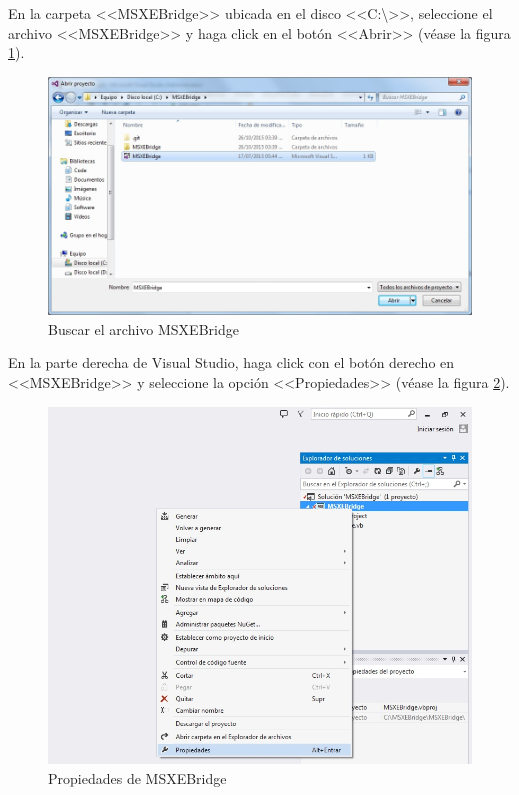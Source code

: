 En la carpeta <<MSXEBridge>> ubicada en el disco <<C:\textbackslash>>, seleccione el archivo <<MSXEBridge>> y haga click en el bot\'{o}n <<Abrir>> (v\'{e}ase la figura \ref{fig:vs-abrir-buscar}).
\vfill
\begin{figure}[H]
  \centering
  \includegraphics[width=.8\linewidth]{./img/vs-abrir-buscar.jpg}
\caption[]{Buscar el archivo MSXEBridge\label{fig:vs-abrir-buscar}}
\end{figure}
\vfill
En la parte derecha de Visual Studio, haga click con el bot\'{o}n derecho en <<MSXEBridge>> y seleccione la opci\'{o}n <<Propiedades>> (v\'{e}ase la figura \ref{fig:vs-propiedades}).
\vfill
\begin{figure}[H]
  \centering
  \includegraphics[width=.7\linewidth]{./img/vs-propiedades.jpg}
\caption[]{Propiedades de MSXEBridge\label{fig:vs-propiedades}}
\end{figure}
\vfill
\newpage

